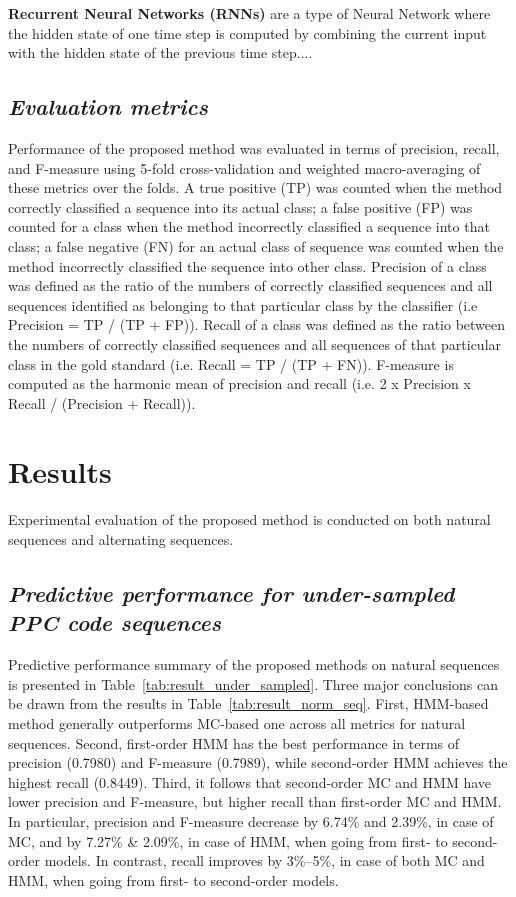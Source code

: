 \documentclass{amia_summit_2018}
\begin{document}
\textbf {Recurrent Neural Networks (RNNs)} are a type of Neural Network where the hidden state of one time step is computed by combining the current input with the hidden state of the previous time step....   

\subsection*{\textit{Evaluation metrics}}
Performance of the proposed method was evaluated in terms of precision, recall, and F-measure using 5-fold cross-validation and weighted macro-averaging of these metrics over the folds. A true positive (TP) was counted when the method correctly classified a sequence into its actual class; a false positive (FP) was counted for a class when the method incorrectly classified a sequence into that class; a false negative (FN) for an actual class of sequence was counted when the method incorrectly classified the sequence into other class. Precision of a class was defined as the ratio of the numbers of correctly classified sequences and all sequences identified as belonging to that particular class by the classifier (i.e Precision = TP / (TP + FP)). Recall of a class was defined as the ratio between the numbers of correctly classified sequences and all sequences of that particular class in the gold standard (i.e. Recall = TP / (TP + FN)). F-measure is computed as the harmonic mean of precision and recall (i.e. 2 x Precision x Recall / (Precision + Recall)).   

\section*{Results}
Experimental evaluation of the proposed method is conducted on both natural sequences and alternating sequences. 

\subsection*{\textit{Predictive performance for under-sampled PPC code sequences}}
Predictive performance summary of the proposed methods on natural sequences is presented in Table~\ref{tab:result_under_sampled}. Three major conclusions can be drawn from the results in Table~\ref{tab:result_norm_seq}. First, HMM-based method generally outperforms MC-based one across all metrics for natural sequences. Second, first-order HMM has the best performance in terms of precision (0.7980) and F-measure (0.7989), while second-order HMM achieves the highest recall (0.8449). Third,  it follows that second-order MC and HMM have lower precision and F-measure, but higher recall than first-order MC and HMM. In particular, precision and F-measure decrease by 6.74\% and 2.39\%, in case of MC, and by 7.27\% \& 2.09\%, in case of HMM, when going from first- to second-order models. In contrast, recall improves by 3\%--5\%, in case of both MC and HMM, when going from first- to second-order models. \\
\end{document}
